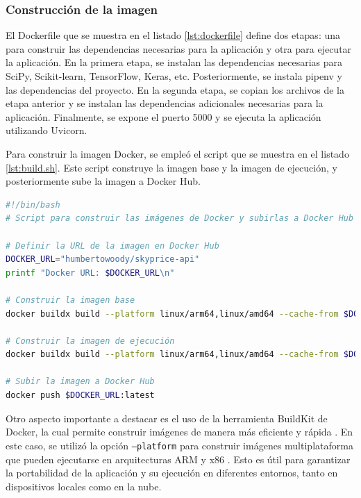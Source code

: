 \subsubsection{Construcción de la imagen}
El Dockerfile que se muestra en el listado \ref{lst:dockerfile} define dos etapas: una para construir las dependencias necesarias para la aplicación y otra para ejecutar la aplicación. En la primera etapa, se instalan las dependencias necesarias para SciPy, Scikit-learn, TensorFlow, Keras, etc. Posteriormente, se instala pipenv y las dependencias del proyecto. En la segunda etapa, se copian los archivos de la etapa anterior y se instalan las dependencias adicionales necesarias para la aplicación. Finalmente, se expone el puerto 5000 y se ejecuta la aplicación utilizando Uvicorn.

Para construir la imagen Docker, se empleó el script que se muestra en el listado \ref{lst:build.sh}. Este script construye la imagen base y la imagen de ejecución, y posteriormente sube la imagen a Docker Hub.

\begin{lstlisting}[language=bash, caption={Script para construir y subir imágenes de Docker}, label={lst:build.sh}]
#!/bin/bash
# Script para construir las imágenes de Docker y subirlas a Docker Hub

# Definir la URL de la imagen en Docker Hub
DOCKER_URL="humbertowoody/skyprice-api"
printf "Docker URL: $DOCKER_URL\n"

# Construir la imagen base
docker buildx build --platform linux/arm64,linux/amd64 --cache-from $DOCKER_URL-builder:latest --cache-to=type=inline --progress plain -t $DOCKER_URL-builder:latest --target builder .

# Construir la imagen de ejecución
docker buildx build --platform linux/arm64,linux/amd64 --cache-from $DOCKER_URL-builder:latest --cache-from $DOCKER_URL:latest --cache-to=type=inline --progress plain -t $DOCKER_URL:latest --target run .

# Subir la imagen a Docker Hub
docker push $DOCKER_URL:latest
\end{lstlisting}

Otro aspecto importante a destacar es el uso de la herramienta BuildKit de Docker, la cual permite construir imágenes de manera más eficiente y rápida \cite{docker_buildkit}. En este caso, se utilizó la opción \texttt{--platform} para construir imágenes multiplataforma que pueden ejecutarse en arquitecturas ARM y x86 \cite{docker_multiplatform}. Esto es útil para garantizar la portabilidad de la aplicación y su ejecución en diferentes entornos, tanto en dispositivos locales como en la nube.

